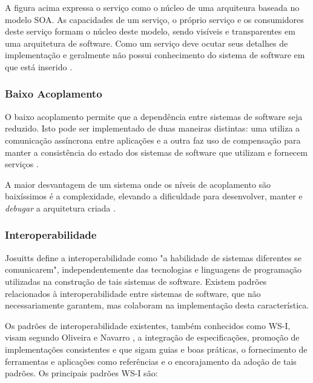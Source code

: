 A figura acima expressa o serviço como o núcleo de uma arquiteura baseada no modelo SOA. As capacidades de um serviço, o próprio serviço e os consumidores deste serviço formam o núcleo deste modelo, sendo visíveis e transparentes em uma arquitetura de software. Como um serviço deve ocutar seus detalhes de implementação e geralmente não possui conhecimento do sistema de software em que está inserido \cite{nickull_service_2007}.

\subsubsection{Baixo Acoplamento}
O baixo acoplamento permite que a dependência entre sistemas de software seja reduzido. Isto pode ser implementado de duas maneiras distintas: uma utiliza a comunicação assíncrona entre aplicações e a outra faz uso de compensação para manter a consistência do estado dos sistemas de software que utilizam e fornecem serviços \cite{josuttis_soa_2007}.

A maior desvantagem de um sistema onde os níveis de acoplamento são baixíssimos é a complexidade, elevando a dificuldade para desenvolver, manter e \textit{debugar} a arquitetura criada \cite{josuttis_soa_2007}.

\subsubsection{Interoperabilidade}
Josuitts \cite{josuttis_soa_2007} define a interoperabilidade como "a habilidade de sistemas diferentes se comunicarem", independentemente das tecnologias e linguagens de programação utilizadas na construção de tais sistemas de software. Existem padrões relacionados à interoperabilidade entre sistemas de software, que não necessariamente garantem, mas colaboram na implementação desta característica. 

Os padrões de interoperabilidade existentes, também conhecidos como WS-I, visam segundo Oliveira e Navarro \cite{oliveira_interoperabilidade}, a integração de especificações, promoção de implementações consistentes e que sigam guias e boas práticas, o fornecimento de ferramentas e aplicações como referências e o encorajamento da adoção de tais padrões. Os principais padrões WS-I são:

